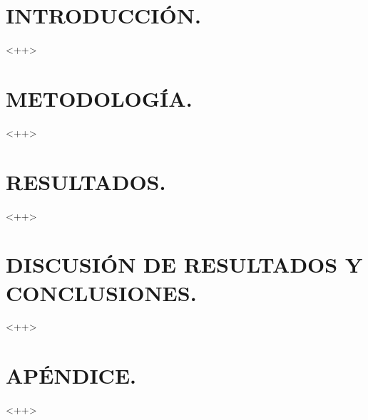 \documentclass[12pt,a4paper]{article}
\begin{document}
\portada

\section{INTRODUCCIÓN.} %

<++>


\section{METODOLOGÍA.} %

<++>


\section{RESULTADOS.} %

<++>


\section{DISCUSIÓN DE RESULTADOS Y CONCLUSIONES.} %

<++>


% 
% 

\section{APÉNDICE.} %

<++>

\end{document}
